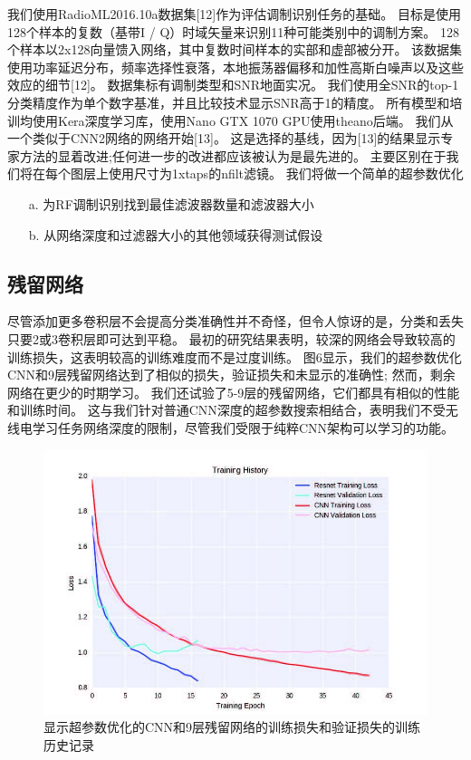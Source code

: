 我们使用RadioML2016.10a数据集[12]作为评估调制识别任务的基础。
目标是使用128个样本的复数（基带I / Q）时域矢量来识别11种可能类别中的调制方案。 
128个样本以2x128向量馈入网络，其中复数时间样本的实部和虚部被分开。
该数据集使用功率延迟分布，频率选择性衰落，本地振荡器偏移和加性高斯白噪声以及这些效应的细节[12]。
数据集标有调制类型和SNR地面实况。
我们使用全SNR的top-1分类精度作为单个数字基准，并且比较技术显示SNR高于1的精度。
所有模型和培训均使用Kera深度学习库，使用Nano GTX 1070 GPU使用theano后端。
我们从一个类似于CNN2网络的网络开始[13]。
这是选择的基线，因为[13]的结果显示专家方法的显着改进;任何进一步的改进都应该被认为是最先进的。
主要区别在于我们将在每个图层上使用尺寸为1xtaps的nfilt滤镜。
我们将做一个简单的超参数优化\par

\begin{enumerate}
	\item[a.] 为RF调制识别找到最佳滤波器数量和滤波器大小
	\item[b.] 从网络深度和过滤器大小的其他领域获得测试假设
\end{enumerate}


\subsection{残留网络}
尽管添加更多卷积层不会提高分类准确性并不奇怪，但令人惊讶的是，分类和丢失只要2或3卷积层即可达到平稳。 最初的研究结果表明，较深的网络会导致较高的训练损失，这表明较高的训练难度而不是过度训练。 图6显示，我们的超参数优化CNN和9层残留网络达到了相似的损失，验证损失和未显示的准确性; 然而，剩余网络在更少的时期学习。 我们还试验了5-9层的残留网络，它们都具有相似的性能和训练时间。 这与我们针对普通CNN深度的超参数搜索相结合，表明我们不受无线电学习任务网络深度的限制，尽管我们受限于纯粹CNN架构可以学习的功能。\par

\begin{figure}[!h]
	\centering
	\includegraphics[scale=1]{figures/chapter_5/fig4}
	\caption{显示超参数优化的CNN和9层残留网络的训练损失和验证损失的训练历史记录}
\end{figure}
\par

